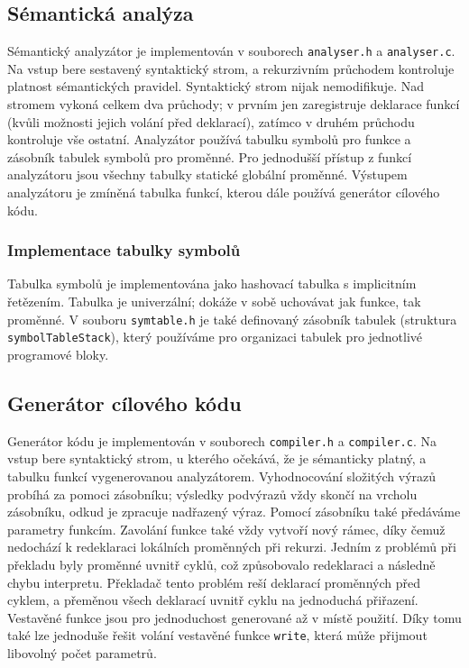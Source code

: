 \subsection{Sémantická analýza}
Sémantický analyzátor je implementován v souborech \texttt{analyser.h} a \texttt{analyser.c}.
Na vstup bere sestavený syntaktický strom, a rekurzivním průchodem kontroluje platnost sémantických pravidel.
Syntaktický strom nijak nemodifikuje.
Nad stromem vykoná celkem dva průchody; v prvním jen zaregistruje deklarace funkcí (kvůli možnosti jejich volání před deklarací),
zatímco v druhém průchodu kontroluje vše ostatní.
Analyzátor používá tabulku symbolů pro funkce a zásobník tabulek symbolů pro proměnné.
Pro jednodušší přístup z funkcí analyzátoru jsou všechny tabulky statické globální proměnné.
Výstupem analyzátoru je zmíněná tabulka funkcí, kterou dále používá generátor cílového kódu.

\subsubsection{Implementace tabulky symbolů}
Tabulka symbolů je implementována jako hashovací tabulka s implicitním řetězením.
Tabulka je univerzální; dokáže v sobě uchovávat jak funkce, tak proměnné.
V souboru \texttt{symtable.h} je také definovaný zásobník tabulek (struktura \texttt{symbolTableStack}),
který používáme pro organizaci tabulek pro jednotlivé programové bloky.

\subsection{Generátor cílového kódu}
Generátor kódu je implementován v souborech \texttt{compiler.h} a \texttt{compiler.c}.
Na vstup bere syntaktický strom, u kterého očekává, že je sémanticky platný, a tabulku funkcí vygenerovanou analyzátorem.
Vyhodnocování složitých výrazů probíhá za pomoci zásobníku; výsledky podvýrazů vždy skončí na vrcholu zásobníku, odkud je zpracuje nadřazený výraz.
Pomocí zásobníku také předáváme parametry funkcím.
Zavolání funkce také vždy vytvoří nový rámec, díky čemuž nedochází k redeklaraci lokálních proměnných při rekurzi.
Jedním z problémů při překladu byly proměnné uvnitř cyklů, což způsobovalo redeklaraci a následně chybu interpretu.
Překladač tento problém reší deklarací proměnných před cyklem, a přeměnou všech deklarací uvnitř cyklu na jednoduchá přiřazení.
Vestavěné funkce jsou pro jednoduchost generované až v místě použití.
Díky tomu také lze jednoduše řešit volání vestavěné funkce \texttt{write}, která může přijmout libovolný počet parametrů.
